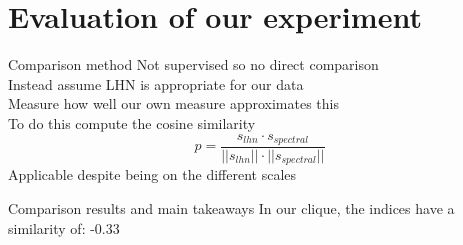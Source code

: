 \documentclass{beamer}
\begin{document}



\section{Evaluation of our experiment}
\begin{frame}{Comparison method}
    Not supervised so no direct comparison\\
    \vspace{0.5cm}
    Instead assume LHN is appropriate for our data\\
    \vspace{0.5cm}
    Measure how well our own measure approximates this\\
    \quad To do this compute the cosine similarity\\
    \vspace{0.5cm}
    \quad \begin{equation}
        p = \frac{s_{lhn}\cdot s_{spectral}}{||s_{lhn}|| \cdot ||s_{spectral}||}
    \end{equation}
    \quad Applicable despite being on the different scales
\end{frame}

\begin{frame}{Comparison results and main takeaways}
        In our clique, the indices have a similarity of: -0.33 \in[-1,1]\\
        \vspace{4cm}
\end{frame}
\end{document}
